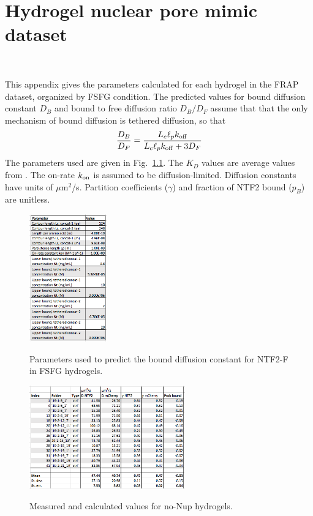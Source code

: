 \chapter{Hydrogel nuclear pore mimic dataset}~\label{appx:dataset}

This appendix gives the parameters calculated for each hydrogel in the FRAP dataset, organized by FSFG condition.  The predicted values for bound diffusion constant $D_B$ and bound to free diffusion ratio $D_B/D_F$ assume that that the only mechanism of bound diffusion is tethered diffusion, so that $$\frac{D_B}{D_F}  = \frac{L_c \ell_p
    k_{\mathrm{off}}}{L_c \ell_p k_{\mathrm{off}} + 3D_F}$$
The parameters used are given in Fig.~\ref{fig:params}.  The $K_D$ values are average values from \cite{hayama18}.  The on-rate $k_{\rm on}$ is assumed to be diffusion-limited.  Diffusion constants have units of $\mu$m$^2$/s.  Partition coefficients ($\gamma$) and fraction of NTF2 bound ($p_B$) are unitless.

\begin{figure}[t!]
\caption[Parameters for predicted bound diffusion.]{Parameters used to predict the bound diffusion constant for NTF2-F in FSFG hydrogels.}%
\centering
\includegraphics[width=0.3\textwidth]{figs/apps/dataset-params.png}
\label{fig:params}
\end{figure} 

\begin{figure}[t!]
\caption[No-Nup hydrogel dataset.]{Measured and calculated values for no-Nup hydrogels.}
\centering
\includegraphics[width=0.6\textwidth]{figs/apps/dataset-ctrl.png}
\label{fig:no-nup}
\end{figure} 

